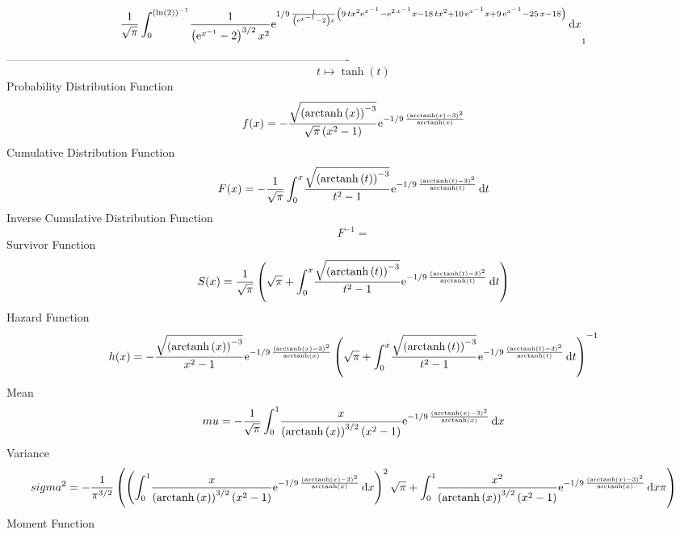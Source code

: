 \documentclass[12pt]{article}
\begin{document}
 $${\frac {1}{\sqrt {\pi}}\int_{0}^{ \left( \ln  \left( 2 \right) 
 \right) ^{-1}}\!{\frac {1}{ \left( {{\rm e}^{{x}^{-1}}}-2 \right) ^{3
/2}{x}^{2}}{{\rm e}^{1/9\,{\frac {1}{ \left( {{\rm e}^{{x}^{-1}}}-2
 \right) x} \left( 9\,t{x}^{2}{{\rm e}^{{x}^{-1}}}-{{\rm e}^{2\,{x}^{-
1}}}x-18\,t{x}^{2}+10\,{{\rm e}^{{x}^{-1}}}x+9\,{{\rm e}^{{x}^{-1}}}-
25\,x-18 \right) }}}}\,{\rm d}x}_{{1}}
$$-------------------------------------------------------------------------------------------  \\$$t\mapsto \tanh \left( t \right) 
$$Probability Distribution Function 
$$  f(x)=-{\frac {\sqrt { \left( {\rm arctanh} \left(x\right) \right) ^{-3}}}{
\sqrt {\pi} \left( {x}^{2}-1 \right) }{{\rm e}^{-1/9\,{\frac { \left( 
{\rm arctanh} \left(x\right)-3 \right) ^{2}}{{\rm arctanh} \left(x
\right)}}}}}
$$Cumulative Distribution Function  
 $$F(x)=-{\frac {1}{\sqrt {\pi}}\int_{0}^{x}\!{\frac {\sqrt { \left( 
{\rm arctanh} \left(t\right) \right) ^{-3}}}{{t}^{2}-1}{{\rm e}^{-1/9
\,{\frac { \left( {\rm arctanh} \left(t\right)-3 \right) ^{2}}{
{\rm arctanh} \left(t\right)}}}}}\,{\rm d}t}
$$ Inverse Cumulative Distribution Function 
  $$F^{-1} = $$Survivor Function 
 $$ S(x)={\frac {1}{\sqrt {\pi}} \left( \sqrt {\pi}+\int_{0}^{x}\!{\frac {
\sqrt { \left( {\rm arctanh} \left(t\right) \right) ^{-3}}}{{t}^{2}-1}
{{\rm e}^{-1/9\,{\frac { \left( {\rm arctanh} \left(t\right)-3
 \right) ^{2}}{{\rm arctanh} \left(t\right)}}}}}\,{\rm d}t \right) }
$$ Hazard Function 
 $$ h(x)=-{\frac {\sqrt { \left( {\rm arctanh} \left(x\right) \right) ^{-3}}}{{
x}^{2}-1}{{\rm e}^{-1/9\,{\frac { \left( {\rm arctanh} \left(x\right)-
3 \right) ^{2}}{{\rm arctanh} \left(x\right)}}}} \left( \sqrt {\pi}+
\int_{0}^{x}\!{\frac {\sqrt { \left( {\rm arctanh} \left(t\right)
 \right) ^{-3}}}{{t}^{2}-1}{{\rm e}^{-1/9\,{\frac { \left( 
{\rm arctanh} \left(t\right)-3 \right) ^{2}}{{\rm arctanh} \left(t
\right)}}}}}\,{\rm d}t \right) ^{-1}}
$$Mean 
 $$ mu=-{\frac {1}{\sqrt {\pi}}\int_{0}^{1}\!{\frac {x}{ \left( {\rm arctanh}
 \left(x\right) \right) ^{3/2} \left( {x}^{2}-1 \right) }{{\rm e}^{-1/
9\,{\frac { \left( {\rm arctanh} \left(x\right)-3 \right) ^{2}}{
{\rm arctanh} \left(x\right)}}}}}\,{\rm d}x}
$$ Variance 
 $$ sigma^2 = -{\frac {1}{{\pi}^{3/2}} \left(  \left( \int_{0}^{1}\!{\frac {x}{
 \left( {\rm arctanh} \left(x\right) \right) ^{3/2} \left( {x}^{2}-1
 \right) }{{\rm e}^{-1/9\,{\frac { \left( {\rm arctanh} \left(x\right)
-3 \right) ^{2}}{{\rm arctanh} \left(x\right)}}}}}\,{\rm d}x \right) ^
{2}\sqrt {\pi}+\int_{0}^{1}\!{\frac {{x}^{2}}{ \left( {\rm arctanh} 
\left(x\right) \right) ^{3/2} \left( {x}^{2}-1 \right) }{{\rm e}^{-1/9
\,{\frac { \left( {\rm arctanh} \left(x\right)-3 \right) ^{2}}{
{\rm arctanh} \left(x\right)}}}}}\,{\rm d}x\pi \right) }
$$Moment Function 
\end{document}
